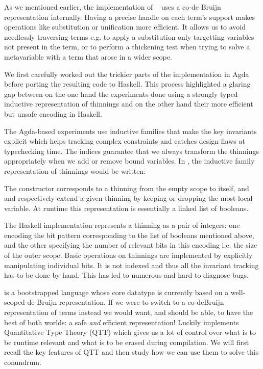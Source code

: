 As we mentioned earlier, the implementation of \typos~\cite{MANUAL:talk/types/Allais22}
uses a co-de Bruijn representation internally.
%
Having a precise handle on each term's support makes operations like substitution or
unification more efficient.
%
It allows us to avoid needlessly traversing terms e.g. to apply a substitution only
targetting variables not present in the term, or to perform a thickening test when
trying to solve a metavariable with a term that arose in a wider scope.

We first carefully worked out the trickier parts of the implementation in Agda before
porting the resulting code to Haskell.
%
This process highlighted a glaring gap between on the one hand the experiments done
using a strongly typed inductive representation of thinnings and on the other hand
their more efficient but unsafe encoding in Haskell.

The Agda-based experiments use inductive families that make the key invariants
explicit which helps tracking complex constraints and catches design flaws at
typechecking time.
%
The indices guarantee that we always transform the thinnings appropriately when
we add or remove bound variables. In \idris{}, the inductive family representation
of thinnings would be written:


The  constructor corresponds to a thinning from the empty scope to
itself, and  and  respectively extend a given thinning
by keeping or dropping the most local variable.
%
At runtime this representation is essentially a linked list of booleans.

The Haskell implementation represents a thinning as a pair of integers: one encoding
the bit pattern corresponding to the list of booleans mentioned above, and the other
specifying the number of relevant bits in this encoding i.e. the size of the outer scope.
%
Basic operations on thinnings are implemented by explicitly manipulating individual bits.
%
It is not indexed and thus all the invariant tracking has to be done by hand.
This has led to numerous and hard to diagnose bugs.

\idris{} is a bootstrapped language whose core datatype is currently based on
a well-scoped de Bruijn representation.
%
If we were to switch to a co-deBruijn representation of terms instead we would want,
and should be able, to have the best of both worlds: a safe \emph{and} efficient
representation!
%
Luckily \idris{} implements Quantitative Type Theory (QTT) which gives us a
lot of control over what is to be runtime relevant and what is to be erased
during compilation.
%
We will first recall the key features of QTT and then study how we can use them
to solve this conundrum.
